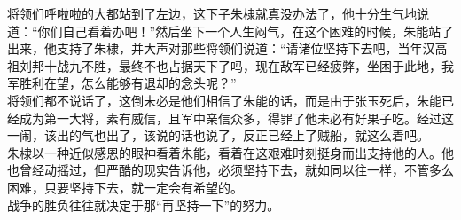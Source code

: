 \begin{multicols}{\theparacolNo}
将领们呼啦啦的大都站到了左边，这下子朱棣就真没办法了，他十分生气地说道：“你们自己看着办吧！”然后坐下一个人生闷气，在这个困难的时候，朱能站了出来，他支持了朱棣，并大声对那些将领们说道：“请诸位坚持下去吧，当年汉高祖刘邦十战九不胜，最终不也占据天下了吗，现在敌军已经疲弊，坐困于此地，我军胜利在望，怎么能够有退却的念头呢？”\\

将领们都不说话了，这倒未必是他们相信了朱能的话，而是由于张玉死后，朱能已经成为第一大将，素有威信，且军中亲信众多，得罪了他未必有好果子吃。经过这一闹，该出的气也出了，该说的话也说了，反正已经上了贼船，就这么着吧。\\

朱棣以一种近似感恩的眼神看着朱能，看着在这艰难时刻挺身而出支持他的人。他也曾经动摇过，但严酷的现实告诉他，必须坚持下去，就如同以往一样，不管多么困难，只要坚持下去，就一定会有希望的。\\

战争的胜负往往就决定于那“再坚持一下”的努力。\\
\ifnum{}
	\end{multicols}
\fi
\newpage
